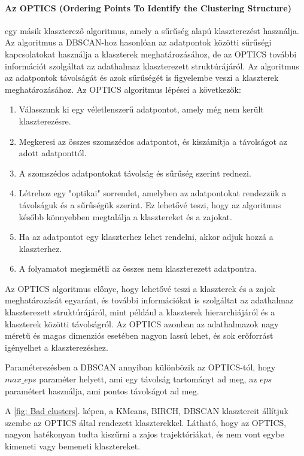 \documentclass[12pt,a4paper]{article}
\begin{document}
\paragraph{Az OPTICS (Ordering Points To Identify the Clustering Structure)} egy másik klaszterező algoritmus, amely a sűrűség alapú klaszterezést használja. Az algoritmus a DBSCAN-hoz hasonlóan az adatpontok közötti sűrűségi kapcsolatokat használja a klaszterek meghatározásához, de az OPTICS további információt szolgáltat az adathalmaz klaszterezett struktúrájáról. Az algoritmus az adatpontok távolságát és azok sűrűségét is figyelembe veszi a klaszterek meghatározásához.
Az OPTICS algoritmus lépései a következők:
\begin{enumerate}
    \item Válasszunk ki egy véletlenszerű adatpontot, amely még nem került klaszterezésre.
    \item Megkeresi az összes szomszédos adatpontot, és kiszámítja a távolságot az adott adatponttól.
    \item A szomszédos adatpontokat távolság és sűrűség szerint rednezi.
    \item Létrehoz egy "optikai" sorrendet, amelyben az adatpontokat rendezzük a távolságuk és a sűrűségük szerint. Ez lehetővé teszi, hogy az algoritmus később könnyebben megtalálja a klasztereket és a zajokat.
    \item Ha az adatpontot egy klaszterhez lehet rendelni, akkor adjuk hozzá a klaszterhez.
    \item A folyamatot megismétli az összes nem klaszterezett adatpontra.
\end{enumerate}
Az OPTICS algoritmus előnye, hogy lehetővé teszi a klaszterek és a zajok meghatározását egyaránt, és további információkat is szolgáltat az adathalmaz klaszterezett struktúrájáról, mint például a klaszterek hierarchiájáról és a klaszterek közötti távolságról. Az OPTICS azonban az adathalmazok nagy méretű és magas dimenziós esetében nagyon lassú lehet, és sok erőforrást igényelhet a klaszterezéshez.

Paraméterezésben a DBSCAN annyiban különbözik az OPTICS-tól, hogy $max\_eps$ paraméter helyett, ami egy távolság tartományt ad meg, az $eps$ paramétert használja, ami pontos távolságot ad meg.

A \ref{fig: Bad clusters}. képen, a KMeans, BIRCH, DBSCAN klasztereit állítjuk szembe az OPTICS által rendezett klaszterekkel. Látható, hogy az OPTICS, nagyon hatékonyan tudta kiszűrni a zajos trajektóriákat, és nem vont egybe kimeneti vagy bemeneti klasztereket.
\end{document}
